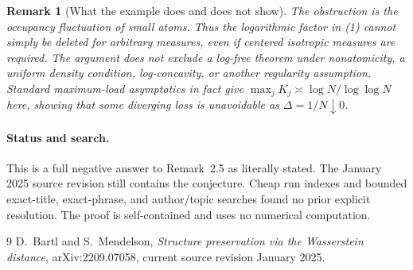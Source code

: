 \documentclass[11pt]{article}
\newtheorem{remark}{Remark}
\begin{document}
\begin{remark}[What the example does and does not show]
The obstruction is the occupancy fluctuation of small atoms.  Thus the
logarithmic factor in (1) cannot simply be deleted for arbitrary measures,
even if centered isotropic measures are required.  The argument does not
exclude a log-free theorem under nonatomicity, a uniform density condition,
log-concavity, or another regularity assumption.  Standard maximum-load
asymptotics in fact give
$\max_jK_j\asymp\log N/\log\log N$ here, showing that some diverging loss is
unavoidable as $\Delta=1/N\downarrow0$.
\end{remark}

\paragraph{Status and search.}
This is a full negative answer to Remark~2.5 as literally stated.  The
January 2025 source revision still contains the conjecture.  Cheap run
indexes and bounded exact-title, exact-phrase, and author/topic searches found
no prior explicit resolution.  The proof is self-contained and uses no
numerical computation.

\begin{thebibliography}{9}
D.~Bartl and S.~Mendelson,
\emph{Structure preservation via the Wasserstein distance},
arXiv:2209.07058, current source revision January 2025.
\end{thebibliography}
\end{document}
